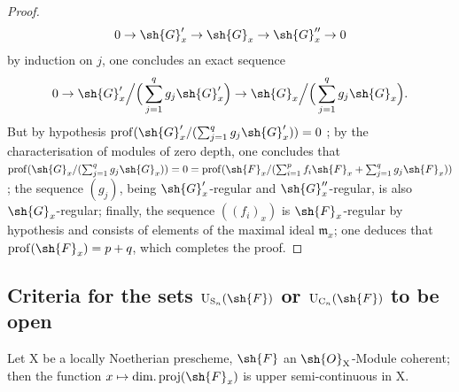\begin{proof}
\[
0\to\sh{G}'_x\to\sh{G}_x\to\sh{G}''_x\to 0
\]
by induction on $j$, one concludes an exact sequence
\[
0\to\sh{G}'_x\Big/\Big(\sum_{j=1}^q g_j\sh{G}'_x\Big)\to\sh{G}_x\Big/\Big(\sum_{j=1}^q g_j\sh{G}_x\Big).
\]
But by hypothesis $\operatorname{prof}(\sh{G}'_x/(\sum_{j=1}^q g_j\sh{G}'_x))=0$ ; by the characterisation  of modules of zero depth, one concludes that $\operatorname{prof}(\sh{G}_x/(\sum_{j=1}^q g_j\sh{G}_x))=0=\operatorname{prof}(\sh{F}_x/(\sum_{i=1}^p f_i\sh{F}_x+\sum_{j=1}^q g_j\sh{F}_x))$; the sequence $(g_j)$, being $\sh{G}'_x$-regular and $\sh{G}''_x$-regular, is also $\sh{G}_x$-regular; finally, the sequence $((f_i)_x)$ is $\sh{F}_x$-regular by hypothesis and consists of elements of the maximal ideal $\mathfrak{m}_x$; one deduces  that $\operatorname{prof}(\sh{F}_x)=p+q$, which completes the proof.
\end{proof}


\subsection{Criteria for the sets \texorpdfstring{$\mathrm{U}_{\mathrm{S}_n}(\sh{F})$}{U\_Sn(F)} or \texorpdfstring{$\mathrm{U}_{\mathrm{C}_n}(\sh{F})$}{U\_Cn(F)} to be open}
\label{subsection:IV.6.11}
\label{IV.6.11}

\begin{lemma}[6.11.1]
\label{IV.6.11.1}
Let $\mathrm{X}$ be a locally Noetherian prescheme, $\sh{F}$ an $\sh{O}_\mathrm{X}$-Module
coherent; then the function $x\mapsto\operatorname{dim.proj}(\sh{F}_x)$ is upper semi-continuous in $\mathrm{X}$.
\end{lemma}

